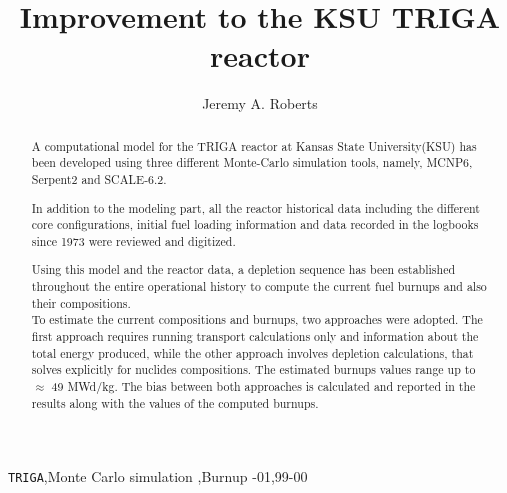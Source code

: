 \documentclass[review,number,sort&compress,12pt]{elsarticle}
\begin{document}
\begin{frontmatter}



\title{Improvement to the KSU TRIGA reactor}


\author{Jeremy A. Roberts}
\address{Department of Mechanical and Nuclear Engineering, Kansas State University, Manhattan, KS 66506, USA}

\begin{abstract}
	A computational model for the TRIGA reactor at Kansas State University(KSU) has been developed using three 
	different Monte-Carlo simulation tools, namely, MCNP6, Serpent2 and SCALE-6.2.
	
	In addition to the modeling part, all the reactor historical data including the different core configurations, initial fuel loading information and data recorded in the logbooks since 1973 were reviewed and digitized.
	
	Using this model and the reactor data, a depletion sequence has been established throughout the entire 
	operational history to compute the current fuel burnups and also their compositions.\\
	To estimate the current compositions and burnups, two approaches were adopted. The first approach requires running transport calculations only and information about the total energy produced, while the other approach involves depletion calculations, that solves explicitly for nuclides compositions. The estimated burnups values range up to $\approx$ 49 MWd/kg. The bias between both approaches is calculated and reported in the results along with the values of the computed burnups.
	
	
\end{abstract}

\begin{keyword}
	\texttt{TRIGA}\sep Monte Carlo simulation \sep Burnup 
	-01\sep  99-00
\end{keyword}
\end{frontmatter}
\end{document}
